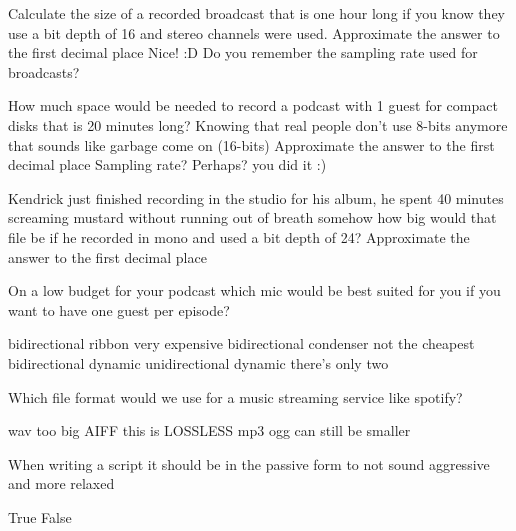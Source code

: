 \documentclass[theme=sleek, randomorder, hidesidemenu]{webquiz}
\begin{document}
\begin{question}
  Calculate the size of a recorded broadcast that is one hour long if you know they use a bit depth of 16 and stereo channels were used.
  Approximate the answer to the first decimal place
  \whenRight Nice! :D
  \whenWrong Do you remember the sampling rate used for broadcasts?
\end{question}

\begin{question}
  How much space would be needed to record a podcast with 1 guest for compact disks that is 20 minutes long? Knowing that real people don't use 8-bits anymore that sounds like garbage come on (16-bits)
  Approximate the answer to the first decimal place
  \whenWrong Sampling rate? Perhaps?
  \whenRight you did it :)
\end{question}

\begin{question}
  Kendrick just finished recording in the studio for his album, he spent 40 minutes screaming mustard without running out of breath somehow how big would that file be if he recorded in mono and used a bit depth of 24?
  Approximate the answer to the first decimal place
\end{question}

\begin{question}
  On a low budget for your podcast which mic would be best suited for you if you want to have one guest per episode?
  \begin{choice}
    \incorrect bidirectional ribbon \feedback very expensive
    \incorrect bidirectional condenser \feedback not the cheapest
    \correct bidirectional dynamic
    \incorrect unidirectional dynamic \feedback there's only two
  \end{choice}
\end{question}

\begin{question}
  Which file format would we use for a music streaming service like spotify?
  \begin{choice}
    \incorrect wav \feedback too big
    \incorrect AIFF \feedback this is LOSSLESS
    \correct mp3
    \incorrect ogg \feedback can still be smaller
  \end{choice}
\end{question}

\begin{question}
  When writing a script it should be in the passive form to not sound aggressive and more relaxed
  \begin{choice}
    \incorrect True
    \correct False
  \end{choice}
\end{question}
\end{document}
